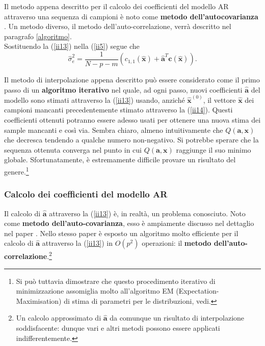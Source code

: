 \documentclass{article}
\begin{document}
Il metodo appena descritto per il calcolo dei coefficienti del modello AR attraverso una sequenza di campioni è noto come \textbf{metodo dell'autocovarianza} \cite{art5}. Un metodo diverso, il metodo dell'auto-correlazione, verrà descritto nel paragrafo \ref{algoritmo}.
\medskip
\\
Sostituendo la (\ref{ii13}) nella (\ref{ii5}) segue che
\begin{equation}
\hat{\sigma}_{e}^{2} = \frac{1}{N-p-m} (c_{1,1}(\mathbf{\hat{x}}) + 
\mathbf{\hat{a}}^{T}\mathbf{c}(\mathbf{\hat{x}})).
\end{equation}

Il metodo di interpolazione appena descritto può essere considerato come il primo passo di un \textbf{algoritmo iterativo} nel quale, ad ogni passo, nuovi coefficienti $\mathbf{\hat{a}}$ del modello sono stimati attraverso la (\ref{ii13}) usando, anziché $\mathbf{\hat{x}}^{(0)}$, il vettore $\mathbf{\hat{x}}$ dei campioni mancanti precedentemente stimato attraverso la (\ref{ii14}). 
Questi coefficienti ottenuti potranno essere adesso usati per ottenere una nuova stima dei sample mancanti e così via. Sembra chiaro, almeno intuitivamente che $Q(\mathbf{a},\mathbf{x})$ che decresca tendendo a qualche numero non-negativo. Si potrebbe sperare che la sequenza ottenuta converga nel punto in cui $Q(\mathbf{a},\mathbf{x})$ raggiunge il suo minimo globale. Sfortunatamente, è estremamente difficile provare un risultato del genere.\footnote{Si può tuttavia dimostrare che questo procedimento iterativo di minimizzazione assomiglia molto all'algoritmo EM (Expectation-Maximisation) di stima di parametri per le distribuzioni, vedi\cite[Appendice B]{paper_1986}.}


	\subsubsection{Calcolo dei coefficienti del modello AR}  \label{aest}
Il calcolo di $\mathbf{\hat{a}}$ attraverso la (\ref{ii13}) è, in realtà, un problema conosciuto. Noto come \textbf{metodo dell'auto-covarianza}, esso è ampiamente discusso nel dettaglio nel paper \cite{art5}. Nello stesso paper è esposto un algoritmo molto efficiente per il calcolo di $\mathbf{\hat{a}}$ attraverso la (\ref{ii13}) in $O(p^{2})$ operazioni: il \textbf{metodo dell'auto-correlazione}.\footnote{Un calcolo approssimato di $\mathbf{\hat{a}}$ da comunque un risultato di interpolazione soddisfacente: dunque vari e altri metodi possono essere applicati indifferentemente.}
\end{document}
